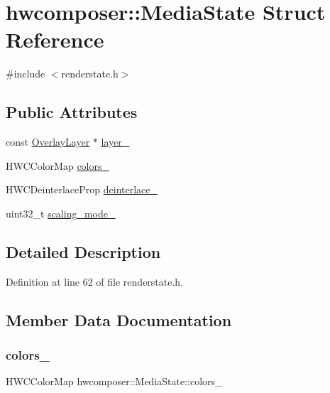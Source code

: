 \hypertarget{structhwcomposer_1_1MediaState}{}\section{hwcomposer\+:\+:Media\+State Struct Reference}
\label{structhwcomposer_1_1MediaState}


{\ttfamily \#include $<$renderstate.\+h$>$}

\subsection*{Public Attributes}
\begin{DoxyCompactItemize}
\item 
const \mbox{\hyperlink{structhwcomposer_1_1OverlayLayer}{Overlay\+Layer}} $\ast$ \mbox{\hyperlink{structhwcomposer_1_1MediaState_a43e040e443a44a8c5ac653f49be17dca}{layer\+\_\+}}
\item 
H\+W\+C\+Color\+Map \mbox{\hyperlink{structhwcomposer_1_1MediaState_a63b705c25506563ee4b6fdde3f4b5817}{colors\+\_\+}}
\item 
H\+W\+C\+Deinterlace\+Prop \mbox{\hyperlink{structhwcomposer_1_1MediaState_a9326ae6dea06def21b8aba4bb4500002}{deinterlace\+\_\+}}
\item 
uint32\+\_\+t \mbox{\hyperlink{structhwcomposer_1_1MediaState_addeecd9addfdd71066eac26d6ef270c3}{scaling\+\_\+mode\+\_\+}}
\end{DoxyCompactItemize}


\subsection{Detailed Description}


Definition at line 62 of file renderstate.\+h.



\subsection{Member Data Documentation}
\mbox{\label{structhwcomposer_1_1MediaState_a63b705c25506563ee4b6fdde3f4b5817}} 
\subsubsection{\texorpdfstring{colors\+\_\+}{colors\_}}
{\footnotesize\ttfamily H\+W\+C\+Color\+Map hwcomposer\+::\+Media\+State\+::colors\+\_\+}




